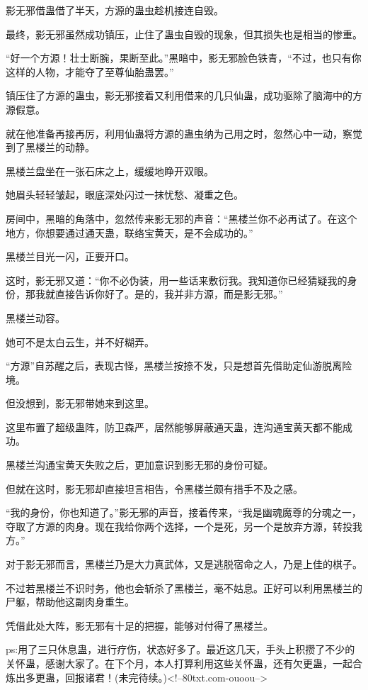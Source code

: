 \begin{this_body}
影无邪借蛊借了半天，方源的蛊虫趁机接连自毁。

最终，影无邪虽然成功镇压，止住了蛊虫自毁的现象，但其损失也是相当的惨重。

“好一个方源！壮士断腕，果断至此。”黑暗中，影无邪脸色铁青，“不过，也只有你这样的人物，才能夺了至尊仙胎蛊罢。”

镇压住了方源的蛊虫，影无邪接着又利用借来的几只仙蛊，成功驱除了脑海中的方源假意。

就在他准备再接再厉，利用仙蛊将方源的蛊虫纳为己用之时，忽然心中一动，察觉到了黑楼兰的动静。

黑楼兰盘坐在一张石床之上，缓缓地睁开双眼。

她眉头轻轻皱起，眼底深处闪过一抹忧愁、凝重之色。

房间中，黑暗的角落中，忽然传来影无邪的声音：“黑楼兰你不必再试了。在这个地方，你想要通过通天蛊，联络宝黄天，是不会成功的。”

黑楼兰目光一闪，正要开口。

这时，影无邪又道：“你不必伪装，用一些话来敷衍我。我知道你已经猜疑我的身份，那我就直接告诉你好了。是的，我并非方源，而是影无邪。”

黑楼兰动容。

她可不是太白云生，并不好糊弄。

“方源”自苏醒之后，表现古怪，黑楼兰按捺不发，只是想首先借助定仙游脱离险境。

但没想到，影无邪带她来到这里。

这里布置了超级蛊阵，防卫森严，居然能够屏蔽通天蛊，连沟通宝黄天都不能成功。

黑楼兰沟通宝黄天失败之后，更加意识到影无邪的身份可疑。

但就在这时，影无邪却直接坦言相告，令黑楼兰颇有措手不及之感。

“我的身份，你也知道了。”影无邪的声音，接着传来，“我是幽魂魔尊的分魂之一，夺取了方源的肉身。现在我给你两个选择，一个是死，另一个是放弃方源，转投我方。”

对于影无邪而言，黑楼兰乃是大力真武体，又是逃脱宿命之人，乃是上佳的棋子。

不过若黑楼兰不识时务，他也会斩杀了黑楼兰，毫不姑息。正好可以利用黑楼兰的尸躯，帮助他这副肉身重生。

凭借此处大阵，影无邪有十足的把握，能够对付得了黑楼兰。

ps:用了三只休息蛊，进行疗伤，状态好多了。最近这几天，手头上积攒了不少的关怀蛊，感谢大家了。在下个月，本人打算利用这些关怀蛊，还有欠更蛊，一起合炼出多更蛊，回报诸君！(未完待续。)<!--80txt.com-ouoou-->

\end{this_body}

